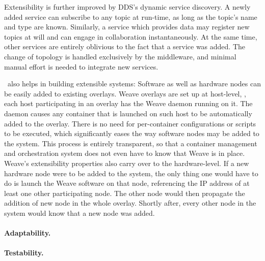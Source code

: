 Extensibility is further improved by DDS's dynamic service discovery. A newly added service can subscribe to any topic at run-time, as long as the topic's name and type are known. Similarly, a service which provides data may register new topics at will and can engage in collaboration instantaneously. At the same time, other services are entirely oblivious to the fact that a service was added. The change of topology is handled exclusively by the middleware, and minimal manual effort is needed to integrate new services.

\wnet\ also helps in building extensible systems: Software as well as hardware nodes can be easily added to existing overlays. Weave overlays are set up at host-level, \ie , each host participating in an overlay has the Weave daemon running on it. The daemon causes any container that is launched on such host to be automatically added to the overlay. There is no need for per-container configurations or scripts to be executed, which significantly eases the way software nodes may be added to the system. This process is entirely transparent, so that a container management and orchestration system does not even have to know that Weave is in place. Weave's extensibility properties also carry over to the hardware-level. If a new hardware node were to be added to the system, the only thing one would  have to do is launch the Weave software on that node, referencing the IP address of at least one other participating node. The other node would then propagate the addition of new node in the whole overlay. Shortly after, every other node in the system would know that a new node was added.


\paragraph{Adaptability.}

\paragraph{Testability.}

